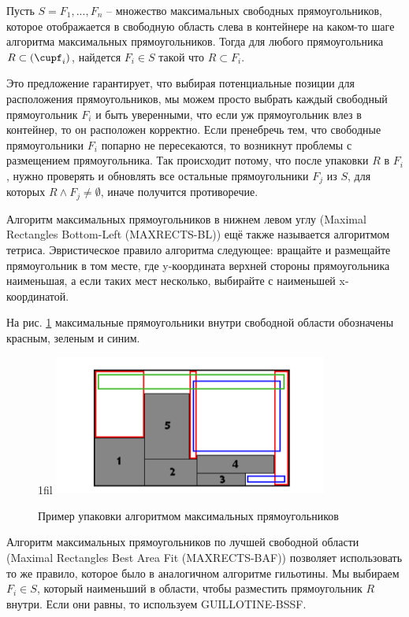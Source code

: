 \documentclass[a4paper,12pt]{report}
\makeatletter
\newcommand*{\centerfloat}{%
  \parindent \z@
  \leftskip \z@ \@plus 1fil \@minus \textwidth
  \rightskip\leftskip
  \parfillskip \z@skip}
\makeatother
\begin{document}
\vspace{20pt}
Пусть $S = {F_1, ... , F_n}$ – множество максимальных свободных прямоугольников, которое отображается в свободную область слева в контейнере на каком-то шаге алгоритма максимальных прямоугольников. Тогда для любого прямоугольника $R \subset (\cupf_i)$, найдется $F_i \in S$ такой что $R \subset F_i$.

Это предложение гарантирует, что выбирая потенциальные позиции для расположения прямоугольников, мы можем просто выбрать каждый свободный прямоугольник $F_i$ и быть уверенными, что если уж прямоугольник влез в контейнер, то он расположен корректно.
Если пренебречь тем, что свободные прямоугольники $F_i$ попарно не пересекаются, то возникнут проблемы с размещением прямоугольника. Так происходит потому, что после упаковки $R$ в $F_i$, нужно проверять и обновлять все остальные прямоугольники $F_j$ из $S$, для которых $R \wedge F_j \neq \emptyset$, иначе получится противоречие. 

\vspace{20pt}
Алгоритм максимальных прямоугольников в нижнем левом углу (Maximal Rectangles Bottom-Left (MAXRECTS-BL)) ещё также называется алгоритмом тетриса. Эвристическое правило алгоритма следующее: вращайте и размещайте прямоугольник в том месте, где y-координата верхней стороны прямоугольника наименьшая, а если таких мест несколько, выбирайте с наименьшей x-координатой.

На рис. \ref{fig:maxrects} максимальные прямоугольники внутри свободной области обозначены красным, зеленым и синим. 

\begin{figure}
    \centerfloat
    \includegraphics[width=0.8\textwidth]{packing/4.png}
    \caption{Пример упаковки алгоритмом максимальных прямоугольников \citep{Jylanki}}
    \label{fig:maxrects}
\end{figure}

Алгоритм максимальных прямоугольников по лучшей свободной области (Maximal Rectangles Best Area Fit (MAXRECTS-BAF)) позволяет использовать то же правило, которое было в аналогичном алгоритме гильотины. Мы выбираем $F_i \in S$, который наименьший в области, чтобы  разместить прямоугольник $R$ внутри. Если они равны, то используем  GUILLOTINE-BSSF.
\end{document}
